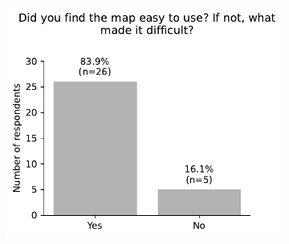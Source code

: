 \begin{appendices}
\begin{figure}[H]
\begin{subfigure}[b]{0.5\textwidth}
	\end{subfigure}%
	\newline
	\begin{subfigure}[b]{0.5\textwidth}
		\includegraphics[width=\textwidth]{visual/figures/survey/9.pdf}
	\end{subfigure}%
	\newline
\end{figure}


\end{appendices}
